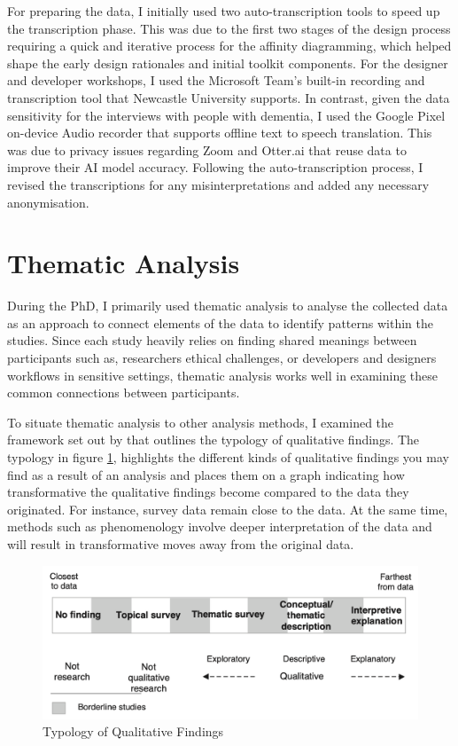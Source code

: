 For preparing the data, I initially used two auto-transcription tools to speed up the transcription phase. This was due to the first two stages of the design process requiring a quick and iterative process for the affinity diagramming, which helped shape the early design rationales and initial toolkit components. For the designer and developer workshops, I used the Microsoft Team's built-in recording and transcription tool that Newcastle University supports. In contrast, given the data sensitivity for the interviews with people with dementia, I used the Google Pixel on-device Audio recorder that supports offline text to speech translation. This was due to privacy issues regarding Zoom and Otter.ai that reuse data to improve their AI model accuracy. Following the auto-transcription process, I revised the transcriptions for any misinterpretations and added any necessary anonymisation. 

\section{Thematic Analysis}
\label{TA}
During the PhD, I primarily used thematic analysis to analyse the collected data as an approach to connect elements of the data to identify patterns within the studies. Since each study heavily relies on finding shared meanings between participants such as, researchers ethical challenges, or developers and designers workflows in sensitive settings, thematic analysis works well in examining these common connections between participants. 

To situate thematic analysis to other analysis methods, I examined the framework set out by \cite{sandelowski2003classifying} that outlines the typology of qualitative findings. The typology in figure \ref{fig:typology}, highlights the different kinds of qualitative findings you may find as a result of an analysis and places them on a graph indicating how transformative the qualitative findings become compared to the data they originated. For instance, survey data remain close to the data. At the same time, methods such as phenomenology involve deeper interpretation of the data and will result in transformative moves away from the original data.

\begin{figure}[htp]
    \centering
    \includegraphics[width=1\linewidth]{Images/Methodology/TypologyOfQualitativeFindings.png}
    \caption{Typology of Qualitative Findings \citep{sandelowski2003classifying}}
    \label{fig:typology}
\end{figure}

